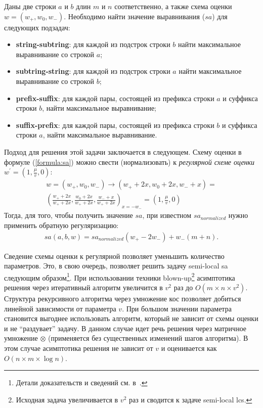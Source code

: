 \begin{definition}
Даны две строки $a$ и $b$ длин $m$ и $n$ соответственно, а также схема оценки $w = (w_{+}, w_{0} , w_{-})$. 
Необходимо найти значение выравнивания ($sa$) для следующих подзадач:
\begin{itemize}
\item \textbf{string-subtring}: для каждой из подстрок строки $b$ найти максимальное выравнивание со строкой $a$;
\item \textbf{subtring-string}: для каждой из подстрок строки $a$ найти максимальное выравнивание со строкой $b$;
\item \textbf{prefix-suffix}: для каждой пары, состоящей из префикса строки $a$ и суффикса строки $b$, найти максимальное выравнивание;
\item \textbf{suffix-prefix}: для каждой пары, состоящей из префикса строки $b$ и суффикса строки $a$, найти максимальное выравнивание. 
\end{itemize}
\end{definition}

Подход для решения этой задачи заключается в следующем.
Схему оценки в формуле (\ref{formula:sa}) можно свести (нормализовать) к \emph{регулярной схеме оценки} $w^{'} = (1,\frac{\mu}{v} ,0)$:
\begin{equation}\label{weightNormalization}
    \begin{aligned}
    w = (w_{+}, w_{0} , w_{-}) \xrightarrow{} (w_{+} +2x , w_{0} + 2x , w_{-} + x) =\\ ( \frac{w_{+} +2x}{w_{+} +2x} , \frac {w_{0} + 2x}{w_{+} +2x} , \frac{w_{-} + x}{w_{+} +2x})_{x=-w_{-}} = (1,\frac{\mu}{v} ,0) 
    \end{aligned}
\end{equation}
Тогда, для того, чтобы получить значение $sa$, при известном $sa_{normalized}$ нужно применить обратную регуляризацию:
\begin{equation}
    \begin{aligned}
    sa(a,b,w) = sa_{normalized}  (w_{+} - 2w_{-}) +  w_{-} (m + n).
    \end{aligned}
\end{equation}

Сведение схемы оценки к регулярной позволяет уменьшить количество параметров.
Это, в свою очередь, позволяет решить задачу semi-local sa следующим образом\footnote{Детали доказательств и сведений см. в~\cite{tiskin2006all}.}. 
При использовании техники blown-up\footnote{Исходная задача увеличивается в $v^2$ раз и сводится к задаче semi-local lcs.} асимптотика решения через итеративный алгоритм увеличится в $v^2$ раз до $O(m \times n \times v^2)$.
Структура рекурсивного алгоритма через умножение кос позволяет добиться линейной зависимости от параметра $v$. 
При большом значении параметра становится выгоднее использовать алгоритм, который не зависит от схемы оценки и не ``раздувает'' задачу. 
В данном случае идет речь  решения через матричное умножение $\otimes$ (применяется без существенных изменений шагов алгоритма). 
В этом случае асимптотика решения не зависит от $v$ и оценивается как $O(n \times m \times \log n)$.


